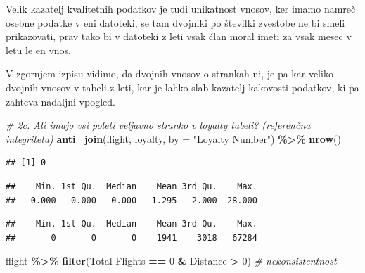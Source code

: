 \documentclass[
]{article}
\newenvironment{Shaded}{\begin{snugshade}}{\end{snugshade}}
\newcommand{\AttributeTok}[1]{\textcolor[rgb]{0.13,0.29,0.53}{#1}}
\newcommand{\CommentTok}[1]{\textcolor[rgb]{0.56,0.35,0.01}{\textit{#1}}}
\newcommand{\DecValTok}[1]{\textcolor[rgb]{0.00,0.00,0.81}{#1}}
\newcommand{\FunctionTok}[1]{\textcolor[rgb]{0.13,0.29,0.53}{\textbf{#1}}}
\newcommand{\NormalTok}[1]{#1}
\newcommand{\SpecialCharTok}[1]{\textcolor[rgb]{0.81,0.36,0.00}{\textbf{#1}}}
\newcommand{\StringTok}[1]{\textcolor[rgb]{0.31,0.60,0.02}{#1}}
\begin{document}
Velik kazatelj kvalitetnih podatkov je tudi unikatnost vnosov, ker imamo
namreč osebne podatke v eni datoteki, se tam dvojniki po številki
zvestobe ne bi smeli prikazovati, prav tako bi v datoteki z leti vsak
član moral imeti za vsak mesec v letu le en vnos.

V zgornjem izpisu vidimo, da dvojnih vnosov o strankah ni, je pa kar
veliko dvojnih vnosov v tabeli z leti, kar je lahko slab kazatelj
kakovosti podatkov, ki pa zahteva nadaljni vpogled.

\begin{Shaded}
\begin{Highlighting}[]
\CommentTok{\# 2c. Ali imajo vsi poleti veljavno stranko v loyalty tabeli? (referenčna integriteta)}
\FunctionTok{anti\_join}\NormalTok{(flight, loyalty, }\AttributeTok{by =} \StringTok{"Loyalty Number"}\NormalTok{) }\SpecialCharTok{\%\textgreater{}\%} \FunctionTok{nrow}\NormalTok{()}
\end{Highlighting}
\end{Shaded}

\begin{verbatim}
## [1] 0
\end{verbatim}

\begin{Shaded}
\end{Shaded}

\begin{verbatim}
##    Min. 1st Qu.  Median    Mean 3rd Qu.    Max. 
##   0.000   0.000   0.000   1.295   2.000  28.000
\end{verbatim}

\begin{Shaded}
\end{Shaded}

\begin{verbatim}
##    Min. 1st Qu.  Median    Mean 3rd Qu.    Max. 
##       0       0       0    1941    3018   67284
\end{verbatim}

\begin{Shaded}
\begin{Highlighting}[]
\NormalTok{flight }\SpecialCharTok{\%\textgreater{}\%} \FunctionTok{filter}\NormalTok{(}\StringTok{\textasciigrave{}}\AttributeTok{Total Flights}\StringTok{\textasciigrave{}} \SpecialCharTok{==} \DecValTok{0} \SpecialCharTok{\&}\NormalTok{ Distance }\SpecialCharTok{\textgreater{}} \DecValTok{0}\NormalTok{) }\CommentTok{\# nekonsistentnost}
\end{Highlighting}
\end{Shaded}
\end{document}
